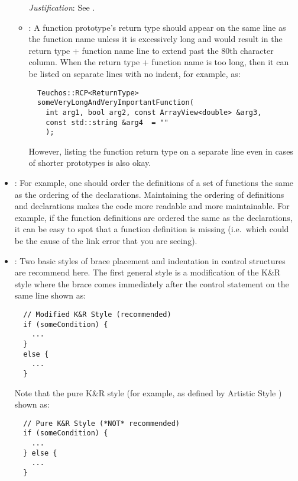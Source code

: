 \begin{itemize}
\begin{itemize}
  {}\textit{Justification}: See {}\cite[Section 31.1]{CodeComplete2nd04}.
  
  {}\item\FSCFunctionReturn: A function prototype's return type should appear
  on the same line as the function name unless it is excessively long and
  would result in the return type + function name line to extend past the 80th
  character column.  When the return type + function name is too long, then it
  can be listed on separate lines with no indent, for example, as:
  
  {\small\begin{verbatim}
  Teuchos::RCP<ReturnType>
  someVeryLongAndVeryImportantFunction(
    int arg1, bool arg2, const ArrayView<double> &arg3,
    const std::string &arg4  = ""
    );
  \end{verbatim}}

  However, listing the function return type on a separate line even in cases
  of shorter prototypes is also okay.

  \end{itemize}


{}\item\FSCOrderFunctionDefinitions: For example, one should order the
definitions of a set of functions the same as the ordering of the
declarations.  Maintaining the ordering of definitions and
declarations makes the code more readable and more maintainable.  For
example, if the function definitions are ordered the same as the
declarations, it can be easy to spot that a function definition is
missing (i.e.\ which could be the cause of the link error that you are
seeing).


{}\item\FSCBracePlacement: Two basic styles of brace placement and indentation
in control structures are recommend here.  The first general style is a
modification of the K\&R style{}\cite{ArtisticStyle} where the brace comes
immediately after the control statement on the same line shown as:

{\small\begin{verbatim}
  // Modified K&R Style (recommended)
  if (someCondition) {
    ...
  }
  else {
    ...
  }
\end{verbatim}}

Note that the pure K\&R style (for example, as defined by Artistic Style
{}\cite{ArtisticStyle}) shown as:

{\small\begin{verbatim}
  // Pure K&R Style (*NOT* recommended)
  if (someCondition) {
    ...
  } else {
    ...
  }
\end{verbatim}}


\end{itemize}
